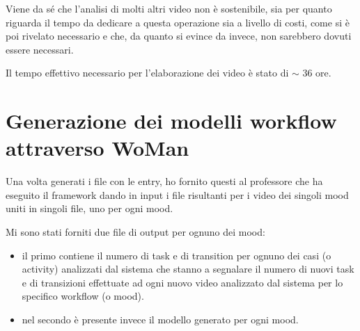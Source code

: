 Viene da sé che l’analisi di molti altri video non è sostenibile, sia per quanto riguarda il tempo da dedicare a questa operazione sia a livello di costi, come si è poi rivelato necessario e che, da quanto si evince da \cite{WoMan} invece, non sarebbero dovuti essere necessari. 

Il tempo effettivo necessario per l'elaborazione dei video è stato di $\sim$ 36 ore.

\section{Generazione dei modelli workflow attraverso WoMan}
Una volta generati i file con le entry, ho fornito questi al professore che ha eseguito il framework dando in input i file risultanti per i video dei singoli mood uniti in singoli file, uno per ogni mood.

Mi sono stati forniti due file di output per ognuno dei mood:
\begin{itemize}
\item il primo contiene il numero di task e di transition per ognuno dei casi (o activity) analizzati dal sistema che stanno a segnalare il numero di nuovi task e di transizioni effettuate ad ogni nuovo video analizzato dal sistema per lo specifico workflow (o mood).
\item nel secondo è presente invece il modello generato per ogni mood.
\end{itemize}

